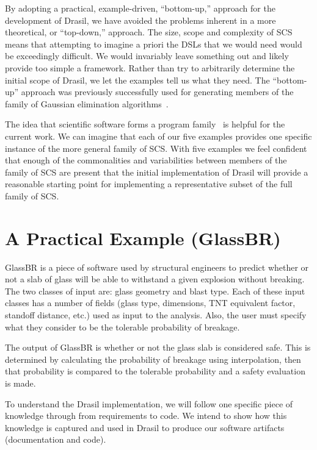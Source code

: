 \documentclass[sigconf]{acmart}
\begin{document}
By adopting a practical, example-driven, ``bottom-up,'' approach for the
development of Drasil, we have avoided the problems inherent in a more
theoretical, or ``top-down,'' approach.  The size, scope and complexity of SCS
means that attempting to imagine a priori the DSLs that we would need would be
exceedingly difficult.  We would invariably leave something out and likely
provide too simple a framework.  Rather than try to arbitrarily determine the
initial scope of Drasil, we let the examples tell us what they need. The
``bottom-up'' approach was previously successfully used for generating members
of the family of Gaussian elimination algorithms~\cite{Carette2006}.  

The idea that scientific software forms a program
family~\cite{SmithMcCutchanAndCao2007} is helpful for the current work.  We can
imagine that each of our five examples provides one specific instance of the
more general family of SCS.  With five examples we feel confident that enough of
the commonalities and variabilities between members of the family of SCS are
present that the initial implementation of Drasil will provide a reasonable
starting point for implementing a representative subset of the full family of
SCS.

\section{A Practical Example (GlassBR)} \label{SecGlassBR}

GlassBR is a piece of software used by structural engineers to predict whether or 
not a slab of glass will be able to withstand a given explosion without
breaking.  The two classes of input are: glass geometry and blast type. Each of these input 
classes has a number of fields (glass type, dimensions, TNT equivalent factor, 
standoff distance, etc.) used as input to the analysis. Also, the user must 
specify what they consider to be the tolerable probability of breakage.

The output of GlassBR is whether or not the glass slab is considered safe. 
This is determined by calculating the probability of breakage using 
interpolation, then that probability is compared to the tolerable probability 
and a safety evaluation is made.

To understand the Drasil implementation, we will follow one specific piece of 
knowledge through from requirements to code. We intend to show how this 
knowledge is captured and used in Drasil to produce our software artifacts 
(documentation and code).
\end{document}
